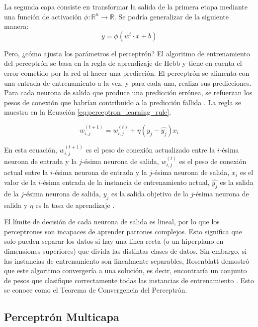 La segunda capa consiste en transformar la salida de la primera etapa mediante una función de activación $\phi: \mathbb{R}^n \to \mathbb{R}$. Se podría generalizar de la siguiente manera:
\begin{equation}
y = \phi(w^t \cdot x + b)
\end{equation}

Pero, ¿cómo ajusta los parámetros el perceptrón? El algoritmo de entrenamiento del perceptrón se basa en la regla de aprendizaje de Hebb\citep{caporale2008spike} y tiene en cuenta el error cometido por la red al hacer una predicción. El perceptrón se alimenta con una entrada de entrenamiento a la vez, y para cada una, realiza sus predicciones. Para cada neurona de salida que produce una predicción errónea, se refuerzan los pesos de conexión que habrían contribuido a la predicción fallida \citep{geron2022hands}. La regla se muestra en la Ecuación \ref{eq:perceptron_learning_rule}.

\begin{equation}
w_{i,j}^{(t+1)} = w_{i,j}^{(t)} + \eta (y_j - \hat{y_j}) x_i
\label{eq:perceptron_learning_rule}
\end{equation}

En esta ecuación, $w_{i,j}^{(t+1)}$ es el peso de conexión actualizado entre la $i$-ésima neurona de entrada y la $j$-ésima neurona de salida, $w_{i,j}^{(t)}$ es el peso de conexión actual entre la $i$-ésima neurona de entrada y la $j$-ésima neurona de salida, $x_i$ es el valor de la $i$-ésima entrada de la instancia de entrenamiento actual, $\hat{y_j}$ es la salida de la $j$-ésima neurona de salida, $y_j$ es la salida objetivo de la $j$-ésima neurona de salida y $\eta$ es la tasa de aprendizaje \citep{geron2022hands}.


El límite de decisión de cada neurona de salida es lineal, por lo que los perceptrones son incapaces de aprender patrones complejos. Esto significa que solo pueden separar los datos si hay una línea recta (o un hiperplano en dimensiones superiores) que divida las distintas clases de datos. Sin embargo, si las instancias de entrenamiento son linealmente separables, Rosenblatt demostró que este algoritmo convergería a una solución, es decir, encontraría un conjunto de pesos que clasifique correctamente todas las instancias de entrenamiento \citep{geron2022hands}. Esto se conoce como el Teorema de Convergencia del Perceptrón.



\subsection{Perceptrón Multicapa} \label{sec: ANN}

